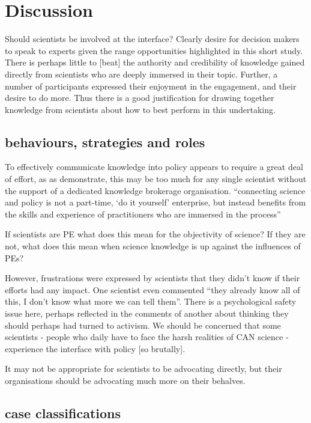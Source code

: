 \chapter{Discussion}\label{ch:discussion}

Should scientists be involved at the interface?
Clearly desire for decision makers to speak to experts given the range opportunities highlighted in this short study. There is perhaps little to [beat] the  authority and credibility of knowledge gained directly from scientists who are deeply immersed in their topic. Further, a number of participants expressed their enjoyment in the engagement, and their desire to do more. Thus there is a good justification for drawing together knowledge from scientists about how to best perform in this undertaking.

\section{behaviours, strategies and roles}
To effectively communicate knowledge into policy appears to require a great deal of effort, as as \textcite{BednarekSHG2015} demonstrate, this may be too much for any single scientist without the support of a dedicated knowledge brokerage organisation. ``connecting science and policy is not a part-time, `do it yourself' enterprise, but instead benefits from the skills and experience of practitioners who are immersed in the process''

If scientists are PE what does this mean for the objectivity of science?
If they are not, what does this mean when science knowledge is up against the influences of PEs?

However, frustrations were expressed by scientists that they didn't know if their efforts had any impact. One scientist even commented ``they already know all of this, I don't know what more we can tell them''. There is a psychological safety issue here, perhaps reflected in the comments of another about thinking they should perhaps had turned to activism. We should be concerned that some scientists - people who daily have to face the harsh realities of CAN science - experience the interface with policy [so brutally].

It may not be appropriate for scientists to be advocating directly, but their organisations should be advocating much more on their behalves.

\section{case classifications}
